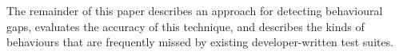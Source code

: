 

The remainder of this paper describes an approach for detecting behavioural gaps, evaluates the accuracy of this technique, and describes the kinds of behaviours that are frequently missed by existing developer-written test suites.

